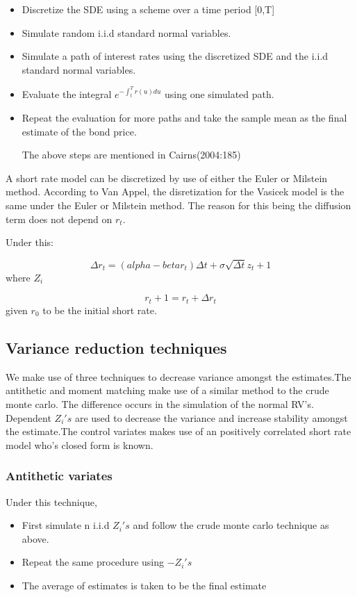 \documentclass[12pt,a4paper]{article}
\begin{document}
\begin{itemize}
	\item Discretize the SDE using a scheme over a time period [0,T]
	\item Simulate random i.i.d standard normal variables.
	\item Simulate a path of interest rates using the discretized SDE and the i.i.d standard normal variables.
	\item Evaluate the integral $e^{-\int_{t}^{T} r(u)du}$ using one simulated path.
	\item Repeat the evaluation for more paths and take the sample mean as the final estimate of the bond price.
	
	The above steps are mentioned in Cairns(2004:185)
\end{itemize}

A short rate model can be discretized by use of either the Euler or Milstein method. According to Van Appel, the disretization for the Vasicek model is the same under the Euler or Milstein method. The reason for this being the diffusion term does not depend on $r_t$. 

Under this:

$$ \Delta r_t= (alpha-beta r_t)\Delta t+ \sigma \sqrt{\Delta t} z_t+1$$ where $Z_i$

$$r_t+1=r_t+\Delta r_t$$ given $r_0$ to be the initial short rate.


\subsection{Variance reduction techniques}

We make use of three techniques to decrease variance amongst the estimates.The antithetic and moment matching make use of a similar method to the crude monte carlo. The difference occurs in the simulation of the normal RV's. Dependent $Z_i's$  are used to decrease the variance and increase stability amongst the estimate.The control variates makes use of an positively correlated short rate model who's closed form is known.    


\subsubsection{Antithetic variates}

Under this technique, 

\begin{itemize}
	\item First simulate n i.i.d $Z_i's$ and follow the crude monte carlo technique as above.
	\item Repeat the same procedure using  $-Z_i's$
	\item The average of estimates is taken to be the final estimate 
\end{itemize}
\end{document}
